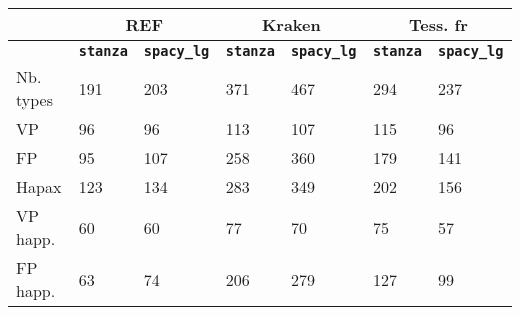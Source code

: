

\begin{tabular}{|l|l|l|l|l|l|l|}
 \hline
 &\multicolumn{2}{c|}{REF}&\multicolumn{2}{c|}{Kraken} &\multicolumn{2}{c|}{Tess. fr}\\
\hline

 & \bf {\texttt{stanza}}  &\bf {\texttt{spacy\_lg }}&\bf {\texttt{stanza}}  &\bf {\texttt{spacy\_lg }}&\bf {\texttt{stanza}}  &\bf {\texttt{spacy\_lg }}\\

\hline
Nb. types& 191& 203&371&467 &294&237\\
VP& 96& 96&113&107&115&96 \\
FP &95 & 107&258&360&179&141\\
\hline
Hapax&123 &134 &283& 349&202&156\\
VP happ.&60&60&77&70&75&57\\
FP happ.&63&74&206&279&127&99\\

\hline

\end{tabular}
